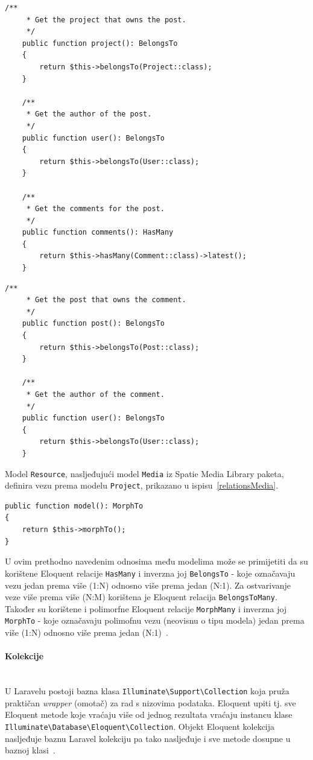 \begin{lstlisting}[caption={Relacije modela \texttt{Post}}, label=relationsPost]
    /**
     * Get the project that owns the post.
     */
    public function project(): BelongsTo
    {
        return $this->belongsTo(Project::class);
    }

    /**
     * Get the author of the post.
     */
    public function user(): BelongsTo
    {
        return $this->belongsTo(User::class);
    }

    /**
     * Get the comments for the post.
     */
    public function comments(): HasMany
    {
        return $this->hasMany(Comment::class)->latest();
    }
\end{lstlisting}

\begin{lstlisting}[caption={Relacije modela \texttt{Comment}}, label=relationsComment]
    /**
     * Get the post that owns the comment.
     */
    public function post(): BelongsTo
    {
        return $this->belongsTo(Post::class);
    }

    /**
     * Get the author of the comment.
     */
    public function user(): BelongsTo
    {
        return $this->belongsTo(User::class);
    }
\end{lstlisting}

Model \texttt{Resource}, nasljeđujući model \texttt{Media} iz Spatie Media Library paketa, definira vezu prema modelu \texttt{Project}, prikazano u ispisu~\ref{relationsMedia}.

\begin{lstlisting}[caption={Relacije modela \texttt{Resource} koje nasljeđuje od modela \texttt{Media}}, label=relationsMedia]
public function model(): MorphTo
{
    return $this->morphTo();
}
\end{lstlisting}

U ovim prethodno navedenim odnosima među modelima može se primijetiti da su korištene Eloquent relacije \texttt{HasMany} i inverzna joj \texttt{BelongsTo} - koje označavaju vezu jedan prema više (1:N) odnosno više prema jedan (N:1). Za ostvarivanje veze više prema više (N:M) korištena je Eloquent relacija \texttt{BelongsToMany}. Također su korištene i polimorfne Eloquent relacije \texttt{MorphMany} i inverzna joj \texttt{MorphTo} - koje označavaju polimofnu vezu (neovisnu o tipu modela) jedan prema više (1:N) odnosno više prema jedan (N:1)~\cite{relationships}.

\paragraph{Kolekcije}\mbox{}\\
\indent U Laravelu postoji bazna klasa \texttt{Illuminate\textbackslash Support\textbackslash Collection} koja pruža praktičan \textit{wrapper} (omotač) za rad s nizovima podataka. Eloquent upiti tj. sve Eloquent metode koje vraćaju više od jednog rezultata vraćaju instancu klase \\ \texttt{Illuminate\textbackslash Database\textbackslash Eloquent\textbackslash Collection}. Objekt Eloquent kolekcija nasljeđuje baznu Laravel kolekciju pa tako nasljeđuje i sve metode dosupne u baznoj klasi~\cite{eloquentCollections}.

